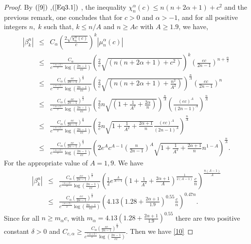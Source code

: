 \documentclass[]{article}
\begin{document}
\begin{proof}
By $(\ref{9})$ ,$(\ref{Eq3.1})$  , the inequality   $\chi_{n}^{\alpha}(c)\leq n(n+2\alpha+1)+c^2$ and  the previous remark,
one concludes that for $c>0$ and $\alpha  >-1$, and  for all positive integers $n,\; k$ such that, $k\leq n/A$ and $n\geq Ac$ with $A\geq 1.9$, we have,
\begin{eqnarray}
|\beta_k^n|  &\leq &C_{\alpha}\left(\frac{2\sqrt{\chi_{n}^{\alpha}(c)}}{c} \right)^k |\mu_{n}^{\alpha}(c)|\nonumber\\
	&\leq &\frac{C_{\alpha}}{c^{\frac{({\alpha+2})}{2}}\log(\frac{2n-1}{ec})}
	\left(\frac{2}{c}\sqrt{\left({n(n+2\alpha+1)+c^2}\right)} \right)^{{k}}\left(\frac{ec}{2n-1}\right)^{n+\frac{\alpha}{2}} \nonumber\\
	&\leq &\frac{C_{\alpha}\left(\frac{ec}{2n-1}\right)^{\frac{\alpha}{2}}}{c^{\frac{({\alpha+2})}{2}}\log(\frac{2n-1}{ec})}
	\left(\frac{2}{c}{\sqrt{\left(n(n+2\alpha+1)+\frac{n^2}{A^2}\right)}} \right)^{\frac{n}{A}}\left(\frac{ec}{2n-1}\right)^{n}\nonumber\\
&\leq &\frac{C_{\alpha}\left(\frac{ec}{2n-1}\right)^{\frac{\alpha}{2}}}{c^{\frac{({\alpha+2})}{2}}\log(\frac{2n-1}{ec})}
	\left(\frac{2}{c}n\sqrt{\left(1+\frac{1}{A^2}+\frac{2\alpha}{n}\right)} \right)^{\frac{n}{A}}\left(\frac{(ec)^A}{(2n-1)^A}\right)^{\frac{n}{A}}\nonumber\\
&\leq &\frac{C_{\alpha}\left(\frac{ec}{2n-1}\right)^{\frac{\alpha}{2}}}{c^{\frac{({\alpha+2})}{2}}\log(\frac{2n-1}{ec})}
	\left(\frac{2}{c}n\sqrt{1+\frac{1}{A^2}+\frac{2\alpha+1}{n}}\frac{(ec)^A}{(2n-1)^A}
\right)^{\frac{n}{A}}\nonumber\\
&\leq &\frac{C_{\alpha}\left(\frac{ec}{2n-1}\right)^{\frac{\alpha}{2}}}{c^{\frac{({\alpha+2})}{2}}\log(\frac{2n-1}{ec})}
	\left(2e^Ac^{A-1}\left(\frac{n}{2n-1}\right)^A\sqrt{1+\frac{1}{A^2}+\frac{2\alpha+1}{n}}n^{1-A}
\right)^{\frac{n}{A}}.
	\end{eqnarray}
For the appropriate value of $A=1,9$. We have
\begin{eqnarray}
  |\beta_k^n| &\leq &\frac{C_{\alpha}\left(\frac{ec}{2n-1}\right)^{\frac{\alpha}{2}}}{c^{\frac{({\alpha+2})}{2}}\log(\frac{2n-1}{ec})}
	\left(\frac{1}{2}e^{\frac{A}{A-1}}\left(1+\frac{1}{A^2}+\frac{2\alpha+1}{A}\right)^{\frac{1}{2(A-1)}}\frac{c}{n}
\right)^{\frac{n(A-1)}{A}}\nonumber\\
&\leq &\frac{C_{\alpha}\left(\frac{ec}{2n-1}\right)^{\frac{\alpha}{2}}}{c^{\frac{({\alpha+2})}{2}}\log(\frac{2n-1}{ec})}
	\left(4.13\left(1.28+\frac{2\alpha+1}{1.9}\right)^{0.55}\frac{c}{n}
\right)^{0.47n}.
\end{eqnarray}
Since for all $n\geq m_{\alpha}c$, with $m_{\alpha}=4.13\left(1.28+\frac{2\alpha+1}{1.9}\right)^{0.55}$ there  are two positive  constant $\delta>0$ and
$C_{c,\alpha}\geq \frac{C_{\alpha}\left(\frac{ec}{2n-1}\right)^{\frac{\alpha}{2}}}{c^{\frac{({\alpha+2})}{2}}\log(\frac{2n-1}{ec})}$.
Then we have  \eqref{10}
\end{proof}
\end{document}
